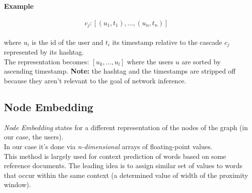 \documentclass{article}
\begin{document}
			\paragraph{Example}
				\begin{addmargin}[1em]{0em}
					$$c_{j}: [(u_{1},t_{1}), ..., (u_{n},t_{n})]$$
					\\
					where $u_{i}$ is the id of the user and $t_{i}$ its timestamp relative to the cascade $c_{j}$ represented by its hashtag.\\
					The representation becomes: $[u_{k},...,u_{l}]$ where the users $u$ are sorted by ascending timestamp. \textbf{Note:} the hashtag and the timestamps are stripped off because they aren't relevant to the goal of network inference.
				\end{addmargin}
		\subsection{Node Embedding}
			\textit{Node Embedding} states for a different representation of the nodes of the graph (in our case, the users).\\
			In our case it's done via \textit{n-dimensional} arrays of floating-point values.\\
			This method is largely used for context prediction of words based on some reference documents. The leading idea is to assign similar set of values to words that occur within the same context (a determined value of width of the proximity window).\\
\end{document}

